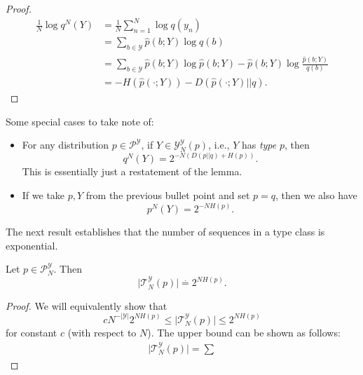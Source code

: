 \begin{proof}
\begin{align*}
	\frac{1}{N}\log q^N(Y) &= \frac{1}{N}\sum_{n=1}^N \log q(y_n) \\
												 &= \sum_{b\in \mathcal{Y}} \hat{p}(b; Y)\log q(b) \\
												 &= \sum_{b\in \mathcal{Y}} \hat{p}(b; Y)\log \hat{p}(b; Y) - \hat{p}(b; Y)\log \frac{\hat{p}(b; Y)}{q(b)} \\
												 &= -H(\hat{p}(\cdot; Y)) - D(\hat{p}(\cdot; Y)||q). 
\end{align*}
\end{proof}

\noindent Some special cases to take note of: 
\begin{itemize}
	\item For any distribution $p\in \mathcal{P}^{\mathcal{Y}}$, if $Y\in \mathcal{Y}_N^{\mathcal{Y}}(p)$, i.e., $Y$ has \textit{type} $p$, then 
		\[q^N(Y) = 2^{-N(D(p||q) + H(p))}.\]
		This is essentially just a restatement of the lemma. 
	\item If we take $p,Y$ from the previous bullet point and set $p=q$, then we also have
		\[p^N(Y) = 2^{-NH(p)}.\] 
\end{itemize}

The next result establishes that the number of sequences in a type class is exponential.

\begin{theorem}
\lemlabel

Let $p\in \mathcal{P}_N^{\mathcal{Y}}$. Then
\[\vert \mathcal{T}_N^{\mathcal{Y}}(p)\vert \overset{\cdot}{=} 2^{NH(p)}.\] 
\end{theorem}

\begin{proof}
We will equivalently show that
\[cN^{-\vert \mathcal{Y}\vert}2^{NH(p)}\leq \vert \mathcal{T}_N^{\mathcal{Y}}(p)\vert \leq 2^{NH(p)}\] 
for constant $c$ (with respect to $N$). The upper bound can be shown as follows: 
\begin{align*}
	\vert \mathcal{T}_N^{\mathcal{Y}}(p)\vert = \sum_{}
\end{align*}
\end{proof}



